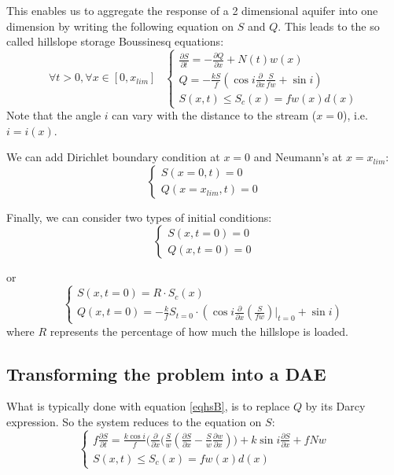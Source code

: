 \documentclass[
journal=jacsat, %
manuscript=article]{achemso}
\begin{document}
This enables us to aggregate the response of a 2 dimensional aquifer into one dimension by writing the following equation on $S$ and $Q$.  
This leads to the so called hillslope storage Boussinesq equations:
\begin{equation}
\label{eqhsB}
\forall t > 0, \forall x \in [0,x_{lim}] \, \,\: \:
\begin{cases}
    \frac{\partial S}{\partial t}  =  -\frac{\partial Q}{\partial x} + N(t)w(x) \\
    Q  =  -\frac{kS}{f}(\cos i \frac{\partial}{\partial x}\frac{S}{fw}+\sin i) \\
    S(x,t) \leq S_{c}(x) = f w(x) d(x)
\end{cases}
\end{equation}
Note that the angle $i$ can vary with the distance to the stream ($x=0$), i.e. $i=i(x)$. 

We can add Dirichlet boundary condition at $x=0$ and Neumann's at $x=x_{lim}$: 
\begin{equation}
\begin{cases}
    S(x=0,t)=0 \\
    Q(x=x_{lim},t)=0
\end{cases}
\end{equation}

Finally, we can consider two types of initial conditions:
\begin{equation}
\begin{cases}
    S(x,t=0)=0 \\ 
    Q(x,t=0)=0
\end{cases}
\end{equation}

or 
\begin{equation}
\begin{cases}
    S(x,t=0)=R \cdot S_{c}(x) \\ 
    Q(x,t=0)=-\frac{k}{f}S_{t=0}\cdot (\cos i \frac{\partial}{\partial x}(\frac{S}{fw})\big|_{t=0}+\sin i)
\end{cases}
\end{equation}
where $R$ represents the percentage of how much the hillslope is loaded.

\subsection{Transforming the problem into a DAE}
What is typically done with equation \ref{eqhsB}, is to replace $Q$ by its Darcy expression. So the system reduces to the equation on $S$:
\begin{equation}
\begin{cases}
        f\frac{\partial S}{\partial t}  =  \frac{k \cos i}{f}(\frac{\partial}{\partial x}\big(\frac{S}{w}(\frac{\partial S}{\partial x}-\frac{S}{w}\frac{\partial w}{\partial x})\big) + k\sin i \frac{\partial S}{\partial x} +fNw \\
        S(x,t) \leq S_{c}(x) = f w(x) d(x)
\end{cases}
\end{equation}
\end{document}
